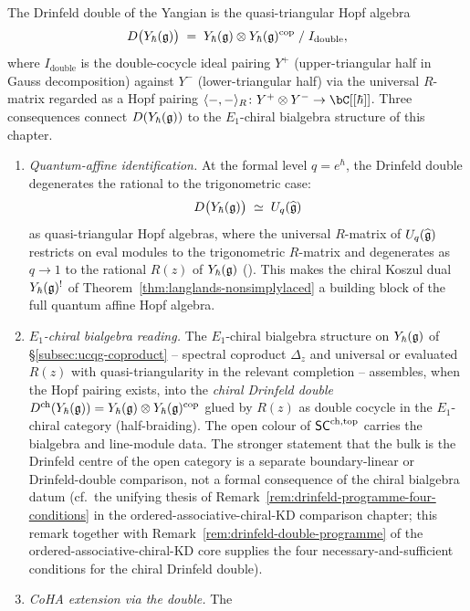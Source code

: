 \begin{remark}
\label{rem:drinfeld-double-chiral-interpretation}
The Drinfeld double of the Yangian is the quasi-triangular Hopf algebra
\[
 D\bigl(Y_{\hbar}(\mathfrak{g})\bigr)
 \;=\; Y_{\hbar}(\mathfrak{g}) \otimes Y_{\hbar}(\mathfrak{g})^{\mathrm{cop}}
 \;/\; I_{\mathrm{double}},
\]
where $I_{\mathrm{double}}$ is the double-cocycle ideal pairing
$Y^{+}$ (upper-triangular half in Gauss decomposition) against
$Y^{-}$ (lower-triangular half) via the universal $R$-matrix regarded
as a Hopf pairing
$\langle -,-\rangle_R \colon Y^{+}\otimes Y^{-}\to \bC[[\hbar]]$.
Three consequences connect $D(Y_{\hbar}(\mathfrak{g}))$ to the $E_1$-chiral
bialgebra structure of this chapter.
\begin{enumerate}
\item[(i)]\emph{Quantum-affine identification.} At the formal level
$q = e^{\hbar}$, the Drinfeld double degenerates the rational to the
trigonometric case:
\[
 D\bigl(Y_{\hbar}(\mathfrak{g})\bigr)
 \;\simeq\; U_q(\widehat{\mathfrak{g}})
\]
as quasi-triangular Hopf algebras, where the universal $R$-matrix of
$U_q(\widehat{\mathfrak{g}})$ restricts on eval modules to the trigonometric
$R$-matrix and degenerates as $q\to 1$ to the rational $R(z)$ of
$Y_{\hbar}(\mathfrak{g})$ (\cite{Drinfeld88,KhoroshkinTolstoy96}). This makes the
chiral Koszul dual $Y_{\hbar}(\mathfrak{g})^{!}$ of
Theorem~\ref{thm:langlands-nonsimplylaced} a building block of the full
quantum affine Hopf algebra.
\item[(ii)]\emph{$E_1$-chiral bialgebra reading.} The $E_1$-chiral
bialgebra structure on $Y_{\hbar}(\mathfrak{g})$ of
\S\ref{subsec:ucqg-coproduct} -- spectral coproduct $\Delta_z$ and
universal or evaluated $R(z)$ with quasi-triangularity in the relevant
completion -- assembles, when the Hopf pairing exists, into the
\emph{chiral Drinfeld double}
$D^{\mathrm{ch}}(Y_{\hbar}(\mathfrak{g})) = Y_{\hbar}(\mathfrak{g})\otimes Y_{\hbar}(\mathfrak{g})^{\mathrm{cop}}$
glued by $R(z)$ as double cocycle in the $E_1$-chiral category
(half-braiding). The open colour of $\mathsf{SC}^{\mathrm{ch},\mathrm{top}}$ carries the bialgebra
and line-module data.  The stronger statement that the bulk is the
Drinfeld centre of the open category is a separate boundary-linear or
Drinfeld-double comparison, not a formal consequence of the chiral
bialgebra datum (cf.\ the
unifying thesis of Remark~\ref{rem:drinfeld-programme-four-conditions}
in the ordered-associative-chiral-KD comparison chapter; this
remark together with Remark~\ref{rem:drinfeld-double-programme} of the
ordered-associative-chiral-KD core supplies the four
necessary-and-sufficient conditions for the chiral Drinfeld double).
\item[(iii)]\emph{CoHA extension via the double.} The

\end{enumerate}
\end{remark}
